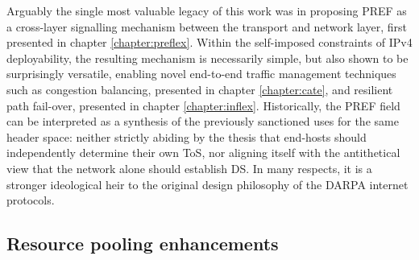 Arguably the single most valuable legacy of this work was in proposing \acf{PREF} as a cross-layer signalling mechanism between the transport and network layer, first presented in chapter \ref{chapter:preflex}.
Within the self-imposed constraints of \ac{IPv4} deployability, the resulting mechanism is necessarily simple, but also shown to be surprisingly versatile, enabling novel end-to-end traffic management techniques such as congestion balancing, presented in chapter \ref{chapter:cate}, and resilient path fail-over, presented in chapter \ref{chapter:inflex}.
Historically, the \ac{PREF} field can be interpreted as a synthesis of the previously sanctioned uses for the same header space: neither strictly abiding by the thesis that end-hosts should independently determine their own \acf{ToS}, nor aligning itself with the antithetical view that the network alone should establish \acf{DS}.
In many respects, it is a stronger ideological heir to the original design philosophy of the \ac{DARPA} internet protocols. 

\subsection{Resource pooling enhancements}

%

